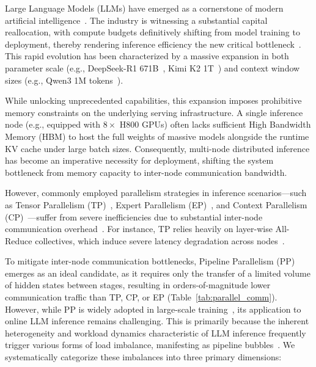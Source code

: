 \documentclass[12pt,a4paper]{article}
\newcommand{\kvcache}{KV cache\xspace}
\begin{document}
Large Language Models (LLMs) have emerged as a cornerstone of modern artificial intelligence~\cite{survey}.
The industry is witnessing a substantial capital reallocation, with compute budgets definitively shifting from model training to deployment, thereby rendering inference efficiency the new critical bottleneck~\cite{splitwise}.
This rapid evolution has been characterized by a massive expansion in both parameter scale (e.g., DeepSeek-R1 671B~\cite{deepseek-r1}, Kimi K2 1T~\cite{kimi2}) and context window sizes (e.g., Qwen3 1M tokens~\cite{qwen3}).

While unlocking unprecedented capabilities, this expansion imposes prohibitive memory constraints on the underlying serving infrastructure.
A single inference node (e.g., equipped with $8 \times$ H800 GPUs) often lacks sufficient High Bandwidth Memory (HBM) to host the full weights of massive models alongside the runtime \kvcache under large batch sizes.
Consequently, multi-node distributed inference has become an imperative necessity for deployment, shifting the system bottleneck from memory capacity to inter-node communication bandwidth.

However, commonly employed parallelism strategies in inference scenarios---such as Tensor Parallelism (TP)~\cite{megatron}, Expert Parallelism (EP)~\cite{deepseekv3,cloudmatrix384}, and Context Parallelism (CP)~\cite{ringattention,loongserve}---suffer from severe inefficiencies due to substantial inter-node communication overhead~\cite{splitwise,distserve}.
For instance, TP relies heavily on layer-wise All-Reduce collectives, which induce severe latency degradation across nodes~\cite{alpa}.

To mitigate inter-node communication bottlenecks, Pipeline Parallelism (PP)~\cite{gpipe,seesaw} emerges as an ideal candidate, as it requires only the transfer of a limited volume of hidden states between stages, resulting in orders-of-magnitude lower communication traffic than TP, CP, or EP (Table~\ref{tab:parallel_comm}).
However, while PP is widely adopted in large-scale training~\cite{gpipe,pipedream,terapipe,zerobubble,vocabparallel}, its application to online LLM inference remains challenging.
This is primarily because the inherent heterogeneity and workload dynamics characteristic of LLM inference frequently trigger various forms of load imbalance, manifesting as pipeline bubbles~\cite{gpipe}.
We systematically categorize these imbalances into three primary dimensions:
\end{document}
